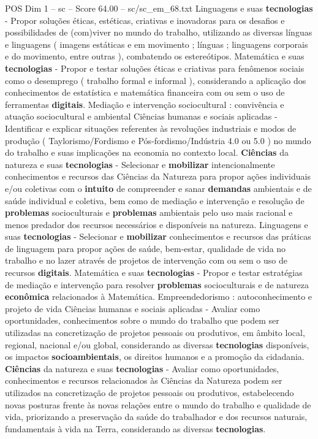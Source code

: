 \begin{textsample}{POS Dim 1 – sc – Score 64.00 – sc/sc\_em\_68.txt}
Linguagens e suas \textbf{tecnologias} - Propor soluções éticas, estéticas, criativas e inovadoras para os desafios e possibilidades de (com)viver no mundo do trabalho, utilizando as diversas línguas e linguagens ( imagens estáticas e em movimento ; línguas ; linguagens corporais e do movimento, entre outras ), combatendo os estereótipos.
Matemática e suas \textbf{tecnologias} - Propor e testar soluções éticas e criativas para fenômenos sociais como o desemprego ( trabalho formal e informal ), considerando a aplicação dos conhecimentos de estatística e matemática financeira com ou sem o uso de ferramentas \textbf{digitais}.
Mediação e intervenção sociocultural : convivência e atuação sociocultural e ambiental Ciências humanas e sociais aplicadas - Identificar e explicar situações referentes às revoluções industriais e modos de produção ( Taylorismo/Fordismo e Pós-fordismo/Indústria 4.0 ou 5.0 ) no mundo do trabalho e suas implicações na economia no contexto local. \textbf{Ciências} da natureza e suas \textbf{tecnologias} - Selecionar e \textbf{mobilizar} intencionalmente conhecimentos e recursos das Ciências da Natureza para propor ações individuais e/ou coletivas com o \textbf{intuito} de compreender e sanar \textbf{demandas} ambientais e de saúde individual e coletiva, bem como de mediação e intervenção e resolução de \textbf{problemas} socioculturais e \textbf{problemas} ambientais pelo uso mais racional e menos predador dos recursos necessários e disponíveis na natureza.
Linguagens e suas \textbf{tecnologias} - Selecionar e \textbf{mobilizar} conhecimentos e recursos das práticas de linguagem para propor ações de saúde, bem-estar, qualidade de vida no trabalho e no lazer através de projetos de intervenção com ou sem o uso de recursos \textbf{digitais}.
Matemática e suas \textbf{tecnologias} - Propor e testar estratégias de mediação e intervenção para resolver \textbf{problemas} socioculturais e de natureza \textbf{econômica} relacionados à Matemática.
Empreendedorismo : autoconhecimento e projeto de vida Ciências humanas e sociais aplicadas - Avaliar como oportunidades, conhecimentos sobre o mundo do trabalho que podem ser utilizadas na concretização de projetos pessoais ou produtivos, em âmbito local, regional, nacional e/ou global, considerando as diversas \textbf{tecnologias} disponíveis, os impactos \textbf{socioambientais}, os direitos humanos e a promoção da cidadania. \textbf{Ciências} da natureza e suas \textbf{tecnologias} - Avaliar como oportunidades, conhecimentos e recursos relacionados às Ciências da Natureza podem ser utilizados na concretização de projetos pessoais ou produtivos, estabelecendo novas posturas frente às novas relações entre o mundo do trabalho e qualidade de vida, priorizando a preservação da saúde do trabalhador e dos recursos naturais, fundamentais à vida na Terra, considerando as diversas \textbf{tecnologias}.

\end{textsample}
